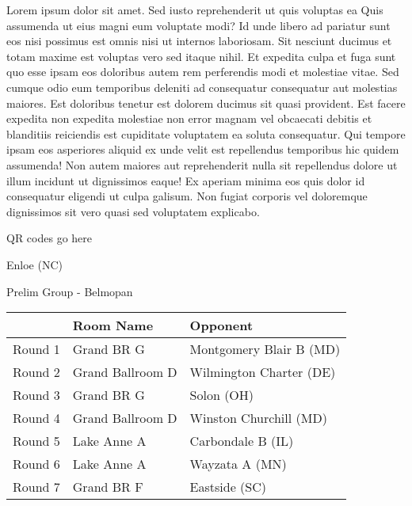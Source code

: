 \documentclass{article}%
\begin{document}
\vspace*{8pt}%
\linebreak%
\newline%
\newline%
Lorem ipsum dolor sit amet. Sed iusto reprehenderit ut quis voluptas ea Quis assumenda ut eius magni eum voluptate modi? Id unde libero ad pariatur sunt eos nisi possimus est omnis nisi ut internos laboriosam. Sit nesciunt ducimus et totam maxime est voluptas vero sed itaque nihil. Et expedita culpa et fuga sunt quo esse ipsam eos doloribus autem rem perferendis modi et molestiae vitae.\newline%
\newline%
Sed cumque odio eum temporibus deleniti ad consequatur consequatur aut molestias maiores. Est doloribus tenetur est dolorem ducimus sit quasi provident. Est facere expedita non expedita molestiae non error magnam vel obcaecati debitis et blanditiis reiciendis est cupiditate voluptatem ea soluta consequatur. Qui tempore ipsam eos asperiores aliquid ex unde velit est repellendus temporibus hic quidem assumenda!\newline%
\newline%
Non autem maiores aut reprehenderit nulla sit repellendus dolore ut illum incidunt ut dignissimos eaque! Ex aperiam minima eos quis dolor id consequatur eligendi ut culpa galisum. Non fugiat corporis vel doloremque dignissimos sit vero quasi sed voluptatem explicabo.\newline%
\newline%
%
\vspace*{30pt}%
\begin{center}%
\begin{Huge}%
QR codes go here%
\end{Huge}%
\end{center}%
\newpage%
%
\begin{center}%
\begin{Huge}%
Enloe (NC)%
\end{Huge}%
\vspace*{8pt}%
\linebreak%
\begin{Large}%
Prelim Group {-} Belmopan%
\end{Large}%
\end{center}%
\begin{tabularx}{\textwidth}{|c|Y|Y|}%
\hline%
&Room Name&Opponent\\%
\hline%
Round 1&Grand BR G&Montgomery Blair B (MD)\\%
Round 2&Grand Ballroom D&Wilmington Charter (DE)\\%
Round 3&Grand BR G&Solon (OH)\\%
Round 4&Grand Ballroom D&Winston Churchill (MD)\\%
Round 5&Lake Anne A&Carbondale B (IL)\\%
Round 6&Lake Anne A&Wayzata A (MN)\\%
Round 7&Grand BR F&Eastside (SC)\\%
\hline%
\end{tabularx}%
\end{document}
